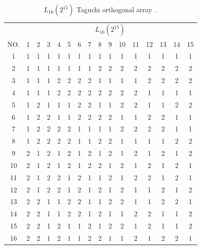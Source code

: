 \begin{table}[ht]
	\centering
	\begin{tabular}{ |c||c|c|c|c|c|c|c|c|c|c|c|c|c|c|c|  }
		\hline
		   & \multicolumn{15}{c|}{ $L_{16}(2^{15})$ } \\
		NO.& 1 & 2 & 3 & 4 & 5 & 6 & 7 & 8 & 9 & 10& 11& 12& 13& 14&15\\
		\hline
		1  & 1 & 1 & 1 & 1 & 1 & 1 & 1 & 1 & 1 & 1 & 1 & 1 & 1 & 1 & 1\\
		2  & 1 & 1 & 1 & 1 & 1 & 1 & 1 & 2 & 2 & 2 & 2 & 2 & 2 & 2 & 2\\
		3  & 1 & 1 & 1 & 2 & 2 & 2 & 2 & 1 & 1 & 1 & 1 & 2 & 2 & 2 & 2\\
		4  & 1 & 1 & 1 & 2 & 2 & 2 & 2 & 2 & 2 & 2 & 2 & 1 & 1 & 1 & 1\\
		5  & 1 & 2 & 1 & 1 & 1 & 2 & 2 & 1 & 1 & 2 & 2 & 1 & 1 & 2 & 2\\
		6  & 1 & 2 & 2 & 1 & 1 & 2 & 2 & 2 & 2 & 1 & 1 & 2 & 2 & 1 & 1\\
		7  & 1 & 2 & 2 & 2 & 2 & 1 & 1 & 1 & 1 & 2 & 2 & 2 & 2 & 1 & 1\\
		8  & 1 & 2 & 2 & 2 & 2 & 1 & 1 & 2 & 2 & 1 & 1 & 1 & 1 & 2 & 2\\
		9  & 2 & 1 & 2 & 1 & 2 & 1 & 2 & 1 & 2 & 1 & 2 & 1 & 2 & 1 & 2\\
		10 & 2 & 1 & 2 & 1 & 2 & 1 & 2 & 2 & 1 & 2 & 1 & 2 & 1 & 2 & 1\\
		11 & 2 & 1 & 2 & 2 & 1 & 2 & 1 & 1 & 2 & 1 & 2 & 2 & 1 & 2 & 1\\
		12 & 2 & 1 & 2 & 2 & 1 & 2 & 1 & 2 & 1 & 2 & 1 & 1 & 2 & 1 & 2\\
		13 & 2 & 2 & 1 & 1 & 2 & 2 & 1 & 1 & 2 & 2 & 1 & 1 & 2 & 2 & 1\\
		14 & 2 & 2 & 1 & 1 & 2 & 2 & 1 & 2 & 1 & 1 & 2 & 2 & 1 & 1 & 2\\
		15 & 2 & 2 & 1 & 2 & 1 & 1 & 2 & 1 & 2 & 2 & 1 & 2 & 1 & 1 & 2\\
		16 & 2 & 2 & 1 & 2 & 1 & 1 & 2 & 2 & 1 & 1 & 2 & 1 & 2 & 2 & 1\\
		\hline
	\end{tabular}
	\caption{$L_{16}(2^{15})$ Taguchi orthogonal array~\cite{roy_primer_1990}.}
	\label{tab:hyperparameter_tuning:L16_orhtogonal_array}
\end{table}

